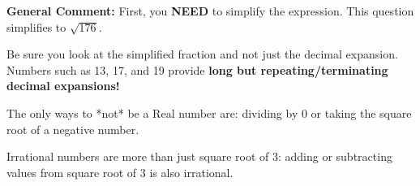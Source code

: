 \documentclass{extbook}[14pt]
\begin{document}
\begin{enumerate}
{\textbf{General Comment:} First, you \textbf{NEED} to simplify the expression. This question simplifies to $\sqrt{176}$. 
 
 Be sure you look at the simplified fraction and not just the decimal expansion. Numbers such as 13, 17, and 19 provide \textbf{long but repeating/terminating decimal expansions!} 
 
 The only ways to *not* be a Real number are: dividing by 0 or taking the square root of a negative number. 
 
 Irrational numbers are more than just square root of 3: adding or subtracting values from square root of 3 is also irrational.
}
\end{enumerate}
\end{document}
